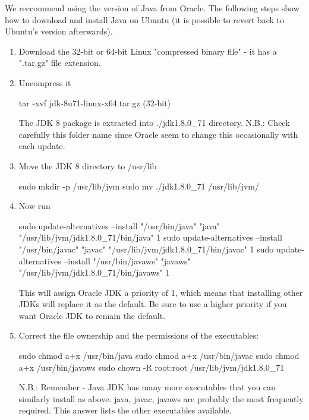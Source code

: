 We reccommend using the version of Java from Oracle. The following steps show how to download and install Java on Ubuntu (it is possible to revert back to Ubuntu's version afterwards).
\begin{enumerate}

\item Download the 32-bit or 64-bit Linux "compressed binary file" - it has a ".tar.gz" file extension.
\item Uncompress it
\begin{sourcecode}
		 tar -xvf jdk-8u71-linux-x64.tar.gz (32-bit)
\end{sourcecode}

    		The JDK 8 package is extracted into ./jdk1.8.0\_71 directory. N.B.: Check carefully this folder name since Oracle seem to change this occasionally with each update.

\item Move the JDK 8 directory to /usr/lib

\begin{sourcecode}
    		sudo mkdir -p /usr/lib/jvm
    		sudo mv ./jdk1.8.0\_71 /usr/lib/jvm/
\end{sourcecode}

\item Now run

\begin{sourcecode}
    		sudo update-alternatives --install "/usr/bin/java" "java" "/usr/lib/jvm/jdk1.8.0\_71/bin/java" 1
    		sudo update-alternatives --install "/usr/bin/javac" "javac" "/usr/lib/jvm/jdk1.8.0\_71/bin/javac" 1
    		sudo update-alternatives --install "/usr/bin/javaws" "javaws" "/usr/lib/jvm/jdk1.8.0\_71/bin/javaws" 1
\end{sourcecode}

    	This will assign Oracle JDK a priority of 1, which means that installing other JDKs will replace it as the default. Be sure to use a higher priority if you want Oracle JDK to remain the default.

\item Correct the file ownership and the permissions of the executables:

\begin{sourcecode}
   		sudo chmod a+x /usr/bin/java
    		sudo chmod a+x /usr/bin/javac
    		sudo chmod a+x /usr/bin/javaws
    		sudo chown -R root:root /usr/lib/jvm/jdk1.8.0\_71
\end{sourcecode}

     	N.B.: Remember - Java JDK has many more executables that you can similarly install as above. java, javac, javaws are probably the most frequently required. This answer lists the other executables available.


\end{enumerate}
